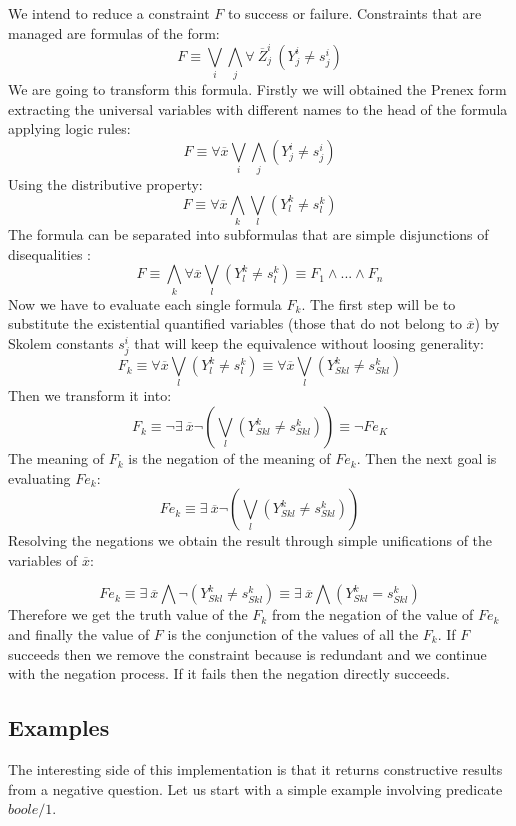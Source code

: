 \documentclass{llncs}
\begin{document}
We intend to reduce a constraint $F$ to success or failure.
Constraints that are managed are formulas of the form:
\[ F \equiv  \bigvee_i\bigwedge_j \forall~ \overline{Z}_j^i~(Y_j^i \neq s_j^i) \]
We are going to transform this formula. Firstly we will obtained the
Prenex form \cite{Shoenfield} extracting the universal variables with
different names to the head of the formula applying logic rules:
\[ F \equiv \forall \overline{x} \bigvee_i\bigwedge_j (Y_j^i \neq s_j^i) \]
Using the distributive property:
\[ F \equiv \forall \overline{x} \bigwedge_k\bigvee_l (Y_l^k \neq s_l^k) \]
The formula can be separated into subformulas that are simple
disjunctions of disequalities :
\[ F \equiv \bigwedge_k \forall \overline{x} \bigvee_l (Y_l^k \neq s_l^k) \equiv F_1 \wedge ... \wedge F_n\]
Now we have to evaluate each single formula $F_k$. The first step will
be to substitute the existential quantified variables (those that do
not belong to $\overline{x}$) by Skolem constants $s^i_j$ that will keep the
equivalence without loosing generality:
\[ F_k \equiv \forall \overline{x} \bigvee_l ( Y_l^k \neq s_l^k ) \equiv \forall \overline{x} \bigvee_l ( Y_{Sk l}^k \neq s_{Sk l}^k )  \]
Then we transform it into:
\[ F_k \equiv  \neg \exists ~ \overline{x} \neg ( \bigvee_l (Y_{Sk l}^k \neq s_{Sk l}^k) ) \equiv \neg Fe_K \]
The meaning of $F_k$ is the negation of the meaning of $Fe_k$. Then
the next goal is evaluating $Fe_k$:
\[ Fe_k \equiv \exists ~ \overline{x} \neg ( \bigvee_l (Y_{Sk l}^k \neq s_{Sk l}^k)) \] 
Resolving the negations we obtain the result through simple unifications of the variables of $\overline{x}$:

\[ Fe_k  \equiv \exists ~ \overline{x} \bigwedge \neg (Y_{Sk l}^k \neq s_{Sk l}^k)  \equiv \exists ~ \overline{x} \bigwedge (Y_{Sk l}^k = s_{Sk l}^k)  \]
        Therefore we get the truth value of the $F_k$ from the
        negation of the value of $Fe_k$ and finally the value of $F$ is
        the conjunction of the values of all the $F_k$. If $F$
        succeeds then we remove the constraint because is redundant
        and we continue with the negation process. If it fails then
        the negation directly succeeds.


\subsection{Examples}
\label{examples}

The interesting side of this implementation is that it returns
constructive results from a negative question. Let us start with a
simple example involving predicate $boole/1$.
\end{document}
